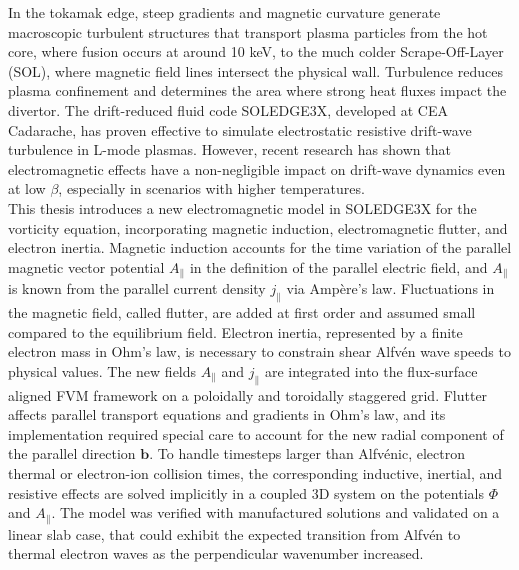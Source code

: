 \label{chap:abstract}

In the tokamak edge, steep gradients and magnetic curvature generate macroscopic turbulent structures that transport plasma particles from the hot core, where fusion occurs at around 10 keV, to the much colder Scrape-Off-Layer (SOL), where magnetic field lines intersect the physical wall. Turbulence reduces plasma confinement and determines the area where strong heat fluxes impact the divertor. The drift-reduced fluid code SOLEDGE3X, developed at CEA Cadarache, has proven effective to simulate electrostatic resistive drift-wave turbulence in L-mode plasmas. However, recent research has shown that electromagnetic effects have a non-negligible impact on drift-wave dynamics even at low $\beta$, especially in scenarios with higher temperatures. \\

This thesis introduces a new electromagnetic model in SOLEDGE3X for the vorticity equation, incorporating magnetic induction, electromagnetic flutter, and electron inertia. Magnetic induction accounts for the time variation of the parallel magnetic vector potential $A_\parallel$ in the definition of the parallel electric field, and $A_\parallel$ is known from the parallel current density $j_\parallel$ via Ampère's law. Fluctuations in the magnetic field, called flutter, are added at first order and assumed small compared to the equilibrium field. Electron inertia, represented by a finite electron mass in Ohm's law, is necessary to constrain shear Alfvén wave speeds to physical values. The new fields $A_\parallel$ and $j_\parallel$ are integrated into the flux-surface aligned FVM framework on a poloidally and toroidally staggered grid. Flutter affects parallel transport equations and gradients in Ohm's law, and its implementation required special care to account for the new radial component of the parallel direction $\textbf{b}$. To handle timesteps larger than Alfvénic, electron thermal or electron-ion collision times, the corresponding inductive, inertial, and resistive effects are solved implicitly in a coupled 3D system on the potentials $\Phi$ and $A_\parallel$. The model was verified with manufactured solutions and validated on a linear slab case, that could exhibit the expected transition from Alfvén to thermal electron waves as the perpendicular wavenumber increased. \\ 

